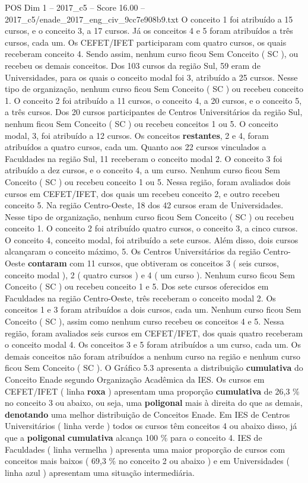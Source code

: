 \begin{textsample}{POS Dim 1 – 2017\_c5 – Score 16.00 – 2017\_c5/enade\_2017\_eng\_civ\_9cc7e908b9.txt}
O conceito 1 foi atribuído a 15 cursos, e o conceito 3, a 17 cursos.
Já os conceitos 4 e 5 foram atribuídos a três cursos, cada um.
Os CEFET/IFET participaram com quatro cursos, os quais receberam conceito 4.
Sendo assim, nenhum curso ficou Sem Conceito ( SC ), ou recebeu os demais conceitos.
Dos 103 cursos da região Sul, 59 eram de Universidades, para os quais o conceito modal foi 3, atribuído a 25 cursos.
Nesse tipo de organização, nenhum curso ficou Sem Conceito ( SC ) ou recebeu conceito 1.
O conceito 2 foi atribuído a 11 cursos, o conceito 4, a 20 cursos, e o conceito 5, a três cursos.
Dos 20 cursos participantes de Centros Universitários da região Sul, nenhum ficou Sem Conceito ( SC ) ou recebeu conceitos 1 ou 5.
O conceito modal, 3, foi atribuído a 12 cursos.
Os conceitos \textbf{restantes}, 2 e 4, foram atribuídos a quatro cursos, cada um.
Quanto aos 22 cursos vinculados a Faculdades na região Sul, 11 receberam o conceito modal 2.
O conceito 3 foi atribuído a dez cursos, e o conceito 4, a um curso.
Nenhum curso ficou Sem Conceito ( SC ) ou recebeu conceito 1 ou 5.
Nessa região, foram avaliados dois cursos em CEFET/IFET, dos quais um recebeu conceito 2, e outro recebeu conceito 5.
Na região Centro-Oeste, 18 dos 42 cursos eram de Universidades.
Nesse tipo de organização, nenhum curso ficou Sem Conceito ( SC ) ou recebeu conceito 1.
O conceito 2 foi atribuído quatro cursos, o conceito 3, a cinco cursos.
O conceito 4, conceito modal, foi atribuído a sete cursos.
Além disso, dois cursos alcançaram o conceito máximo, 5.
Os Centros Universitários da região Centro-Oeste \textbf{contaram} com 11 cursos, que obtiveram os conceitos 3 ( seis cursos, conceito modal ), 2 ( quatro cursos ) e 4 ( um curso ).
Nenhum curso ficou Sem Conceito ( SC ) ou recebeu conceito 1 e 5.
Dos sete cursos oferecidos em Faculdades na região Centro-Oeste, três receberam o conceito modal 2.
Os conceitos 1 e 3 foram atribuídos a dois cursos, cada um.
Nenhum curso ficou Sem Conceito ( SC ), assim como nenhum curso recebeu os conceitos 4 e 5.
Nessa região, foram avaliados seis cursos em CEFET/IFET, dos quais quatro receberam o conceito modal 4.
Os conceitos 3 e 5 foram atribuídos a um curso, cada um.
Os demais conceitos não foram atribuídos a nenhum curso na região e nenhum curso ficou Sem Conceito ( SC ).
O Gráfico 5.3 apresenta a distribuição \textbf{cumulativa} do Conceito Enade segundo Organização Acadêmica da IES.
Os cursos em CEFET/IFET ( linha \textbf{roxa} ) apresentam uma proporção \textbf{cumulativa} de 26,3 \% no conceito 3 ou abaixo, ou seja, uma \textbf{poligonal} mais à direita do que as demais, \textbf{denotando} uma melhor distribuição de Conceitos Enade.
Em IES de Centros Universitários ( linha verde ) todos os cursos têm conceitos 4 ou abaixo disso, já que a \textbf{poligonal} \textbf{cumulativa} alcança 100 \% para o conceito 4.
IES de Faculdades ( linha vermelha ) apresenta uma maior proporção de cursos com conceitos mais baixos ( 69,3 \% no conceito 2 ou abaixo ) e em Universidades ( linha azul ) apresentam uma situação intermediária.


\end{textsample}
